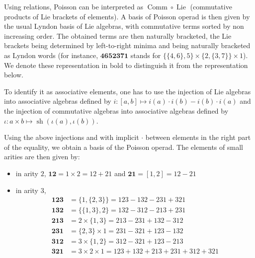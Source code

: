 \documentclass[11pt,leqno]{amsart}
\theoremstyle{definition}
\theoremstyle{plain}
\begin{document}
Using relations, Poisson can be interpreted as $\operatorname{Comm} \circ \operatorname{Lie}$ (commutative products of Lie brackets of elements). A basis of Poisson operad is then given by the usual Lyndon basis of Lie algebras, with commutative terms sorted by non increasing order. The obtained terms are then naturally bracketed, the Lie brackets being determined by left-to-right minima and being naturally bracketed as Lyndon words (for instance, $\mathbf{4652371}$ stands for $\lbrace \lbrace 4,6 \rbrace ,5\rbrace \times \lbrace 2, \lbrace 3,7 \rbrace \rbrace \times 1$). We denote these representation in bold to distinguish it from the representation below.


To identify it as associative elements, one has to use the injection of Lie algebras into associative algebras defined by $i: [a,b] \mapsto i(a) \cdot i(b) - i(b) \cdot i(a)$ and the injection of commutative algebras into associative algebras defined by $\iota: a \times b \mapsto \operatorname{sh}(\iota(a), \iota(b) )$.

Using the above injections and with implicit $\cdot$ between elements in the right part of the equality, we obtain a basis of the Poisson operad. The elements of small arities are then given by:
\begin{itemize}
\item in arity $2$, $\mathbf{12}=1 \times 2 = 12+21$ and $\mathbf{21}=[1,2] = 12-21$
\item in arity $3$, 
\begin{align*}
\mathbf{123}&= \lbrace 1 , \lbrace 2,3 \rbrace \rbrace = 123-132-231+321\\
\mathbf{132}&= \lbrace \lbrace1, 3 \rbrace, 2\rbrace = 132-312-213+231\\
\mathbf{213}&= 2 \times \lbrace1,3 \rbrace = 213-231+132-312\\
\mathbf{231}&=\lbrace 2,3 \rbrace \times 1= 231-321+123-132\\
\mathbf{312} &=3 \times \lbrace 1, 2 \rbrace= 312-321+123-213\\
\mathbf{321} &=3 \times 2 \times 1= 123+132+213+231+312+321 
\end{align*}
\end{itemize}
\end{document}
